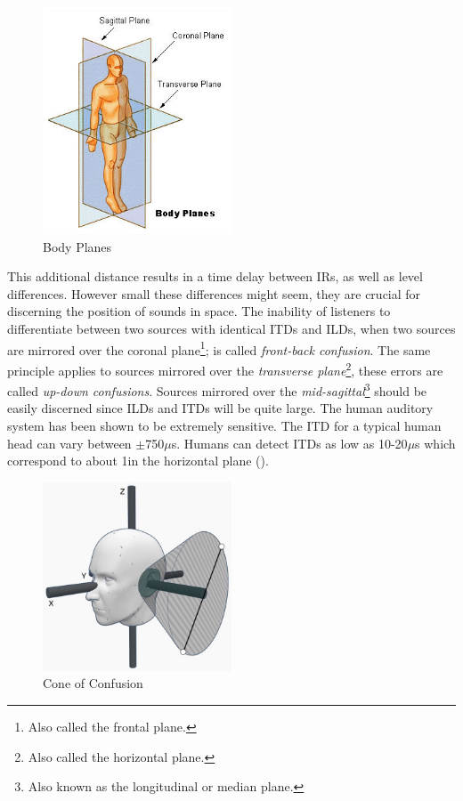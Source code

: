 \begin{figure}[ht!]%
\centering
\includegraphics[width=0.5\textwidth]{img/body-planes.jpg}
\caption{Body Planes \cite{body_planes_pic}}
\label{fig:body-planes}
\end{figure}

This additional distance results in a time delay between IRs, as well as level differences. However small these differences might seem, they are crucial for discerning the position of sounds in space. The inability of listeners to differentiate between two sources with identical ITDs and ILDs, when two sources are mirrored over the coronal plane\footnote{Also called the frontal plane.}; is called \textit{front-back confusion}. The same principle applies to sources mirrored over the \textit{transverse plane}\footnote{Also called the horizontal plane.}, these errors are called \textit{up-down confusions}. Sources mirrored over the \textit{mid-sagittal}\footnote{Also known as the longitudinal or median plane.} should be easily discerned since ILDs and ITDs will be quite large. The human auditory system has been shown to be extremely sensitive. The ITD for a typical human head can vary between $\pm$750$\mu$s. Humans can detect ITDs as low as 10-20$\mu$s which correspond to about 1\textdegree in the horizontal plane (\cite{hacihabiboglu2017perceptual}). 

\begin{figure}[ht!]%
\centering
\includegraphics[width=0.5\textwidth]{img/cone_confusion.JPG}
\caption{Cone of Confusion}
\label{fig:cone-confusion}
\end{figure}

